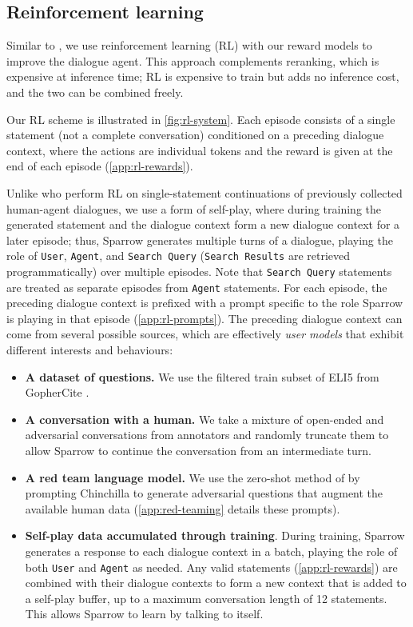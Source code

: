 \subsection{Reinforcement learning} \label{sec:rl}

Similar to \citep{bai2022training}, we use reinforcement learning (RL) with our reward models to improve the dialogue agent. This approach complements reranking, which is expensive at inference time; RL is expensive to train but adds no inference cost, and the two can be combined freely.

Our RL scheme is illustrated in \ref{fig:rl-system}. Each episode consists of a single statement (not a complete conversation) conditioned on a preceding dialogue context, where the actions are individual tokens and the reward is given at the end of each episode (\ref{app:rl-rewards}).

Unlike \citet{bai2022training} who perform RL on single-statement continuations of previously collected human-agent dialogues, we use a form of self-play, where during training the generated statement and the dialogue context form a new dialogue context for a later episode; thus, Sparrow generates multiple turns of a dialogue, playing the role of \texttt{User}, \texttt{Agent}, and \texttt{Search Query} (\texttt{Search Results} are retrieved programmatically) over multiple episodes. Note that \texttt{Search Query} statements are treated as separate episodes from \texttt{Agent} statements. For each episode, the preceding dialogue context is prefixed with a prompt specific to the role Sparrow is playing in that episode (\ref{app:rl-prompts}). The preceding dialogue context can come from several possible sources, which are effectively \emph{user models} that exhibit different interests and behaviours:

\begin{itemize}
    \item \textbf{A dataset of questions.} We use the filtered train subset of ELI{5} from GopherCite \citep{eli5, menick2022teaching}.
    \item \textbf{A conversation with a human.} We take a mixture of open-ended and adversarial conversations from annotators and randomly truncate them to allow Sparrow to continue the conversation from an intermediate turn.
    \item \label{itm:red-teaming} \textbf{A red team language model.} We use the zero-shot method of \citet{perez2022redteaming} by prompting Chinchilla to generate adversarial questions that augment the available human data (\ref{app:red-teaming} details these prompts). 
    \item \textbf{Self-play data accumulated through training}. During training, Sparrow generates a response to each dialogue context in a batch, playing the role of both \texttt{User} and \texttt{Agent} as needed. Any valid statements (\ref{app:rl-rewards}) are combined with their dialogue contexts to form a new context that is added to a self-play buffer, up to a maximum conversation length of 12 statements. This allows Sparrow to learn by talking to itself.
\end{itemize}

